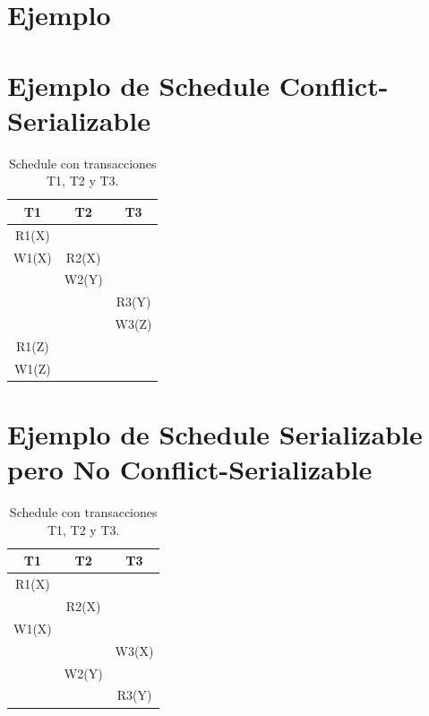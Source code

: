 \documentclass{article}
\begin{document}
\section{Ejemplo}

\section{Ejemplo de Schedule Conflict-Serializable}

\begin{table}[h!]
\centering
\begin{tabular}{|c|c|c|}
\hline
\textbf{T1}       & \textbf{T2}       & \textbf{T3}       \\ \hline
R1(X)             &                   &                   \\ \hline
W1(X)             & R2(X)             &                   \\ \hline
                  & W2(Y)             &                   \\ \hline
                  &                   & R3(Y)             \\ \hline
                  &                   & W3(Z)             \\ \hline
R1(Z)             &                   &                   \\ \hline
W1(Z)             &                   &                   \\ \hline
\end{tabular}
\caption{Schedule con transacciones T1, T2 y T3.}
\label{tab:conflict_serializable_example}
\end{table}

\section{Ejemplo de Schedule Serializable pero No Conflict-Serializable}

\begin{table}[h!]
\centering
\begin{tabular}{|c|c|c|}
\hline
\textbf{T1}       & \textbf{T2}       & \textbf{T3}       \\ \hline
R1(X)             &                   &                   \\ \hline
                  & R2(X)             &                   \\ \hline
W1(X)             &                   &                   \\ \hline
                  &                   & W3(X)             \\ \hline
                  & W2(Y)             &                   \\ \hline
                  &                   & R3(Y)             \\ \hline
\end{tabular}
\caption{Schedule con transacciones T1, T2 y T3.}
\label{tab:serializable_not_conflict_serializable}
\end{table}
\end{document}
